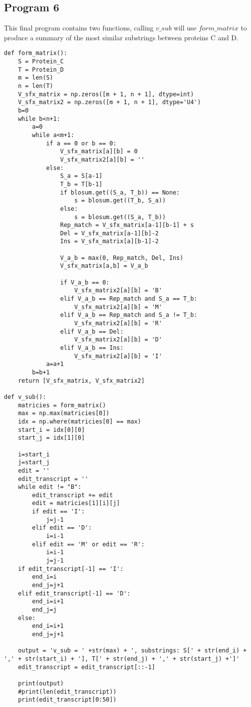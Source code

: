 \documentclass{article}
\begin{document}
\subsection{Program 6}
\vspace{-0.3cm}
\label{subsec:Program 6} 
This final program contains two functions, calling $v\_sub$ will use $form\_matrix$ to produce a summary of the most similar substrings between proteins C and D.
\begin{lstlisting}
def form_matrix():
    S = Protein_C
    T = Protein_D
    m = len(S)
    n = len(T)
    V_sfx_matrix = np.zeros([m + 1, n + 1], dtype=int)
    V_sfx_matrix2 = np.zeros([m + 1, n + 1], dtype='U4')
    b=0
    while b<n+1:
        a=0
        while a<m+1:
            if a == 0 or b == 0:
                V_sfx_matrix[a][b] = 0
                V_sfx_matrix2[a][b] = ''
            else:
                S_a = S[a-1]
                T_b = T[b-1]
                if blosum.get((S_a, T_b)) == None:
                    s = blosum.get((T_b, S_a))
                else:
                    s = blosum.get((S_a, T_b))
                Rep_match = V_sfx_matrix[a-1][b-1] + s
                Del = V_sfx_matrix[a-1][b]-2
                Ins = V_sfx_matrix[a][b-1]-2

                V_a_b = max(0, Rep_match, Del, Ins)
                V_sfx_matrix[a,b] = V_a_b

                if V_a_b == 0:
                    V_sfx_matrix2[a][b] = 'B'
                elif V_a_b == Rep_match and S_a == T_b:
                    V_sfx_matrix2[a][b] = 'M'
                elif V_a_b == Rep_match and S_a != T_b:
                    V_sfx_matrix2[a][b] = 'R'
                elif V_a_b == Del:
                    V_sfx_matrix2[a][b] = 'D'
                elif V_a_b == Ins:
                    V_sfx_matrix2[a][b] = 'I'
            a=a+1
        b=b+1
    return [V_sfx_matrix, V_sfx_matrix2]

def v_sub():
    matricies = form_matrix()
    max = np.max(matricies[0])
    idx = np.where(matricies[0] == max)
    start_i = idx[0][0]
    start_j = idx[1][0]

    i=start_i
    j=start_j
    edit = ''
    edit_transcript = ''
    while edit != "B":
        edit_transcript += edit
        edit = matricies[1][i][j]
        if edit == 'I':
            j=j-1
        elif edit == 'D':
            i=i-1
        elif edit == 'M' or edit == 'R':
            i=i-1
            j=j-1
    if edit_transcript[-1] == 'I':
        end_i=i
        end_j=j+1
    elif edit_transcript[-1] == 'D':
        end_i=i+1
        end_j=j
    else:
        end_i=i+1
        end_j=j+1

    output = 'v_sub = ' +str(max) + ', substrings: S[' + str(end_i) + ',' + str(start_i) + '], T[' + str(end_j) + ',' + str(start_j) +']'
    edit_transcript = edit_transcript[::-1]

    print(output)
    #print(len(edit_transcript))
    print(edit_transcript[0:50])
\end{lstlisting}
\end{document}
